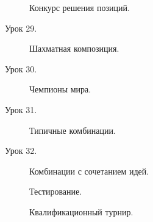 \begin{description}
Конкурс решения позиций.

\item [Урок 29.] Шахматная композиция.
\item [Урок 30.] Чемпионы мира.
\item [Урок 31.] Типичные комбинации.
\item [Урок 32.] Комбинации с сочетанием идей.

Тестирование.

Квалификационный турнир.
\end{description}